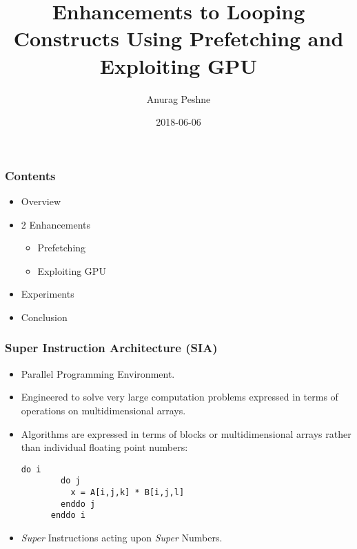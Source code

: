 \documentclass{beamer}
\title{Enhancements to Looping Constructs Using Prefetching and Exploiting GPU}
\author{Anurag Peshne}
\date{2018-06-06}
\begin{document}
\begin{frame}
  \titlepage
\end{frame}
\begin{frame}\frametitle{Contents}
  \pause
  \begin{itemize}
  \item Overview%
    \pause
  \item 2 Enhancements
    \pause
    \begin{itemize}
    \item Prefetching
      \pause
    \item Exploiting GPU
      \pause
    \end{itemize}
  \item Experiments
    \pause
  \item Conclusion
  \end{itemize}
\end{frame}

\begin{frame}[fragile]\frametitle{Super Instruction Architecture (SIA)}
  \begin{itemize}
    \pause
  \item Parallel Programming Environment.
    \pause
  \item Engineered to solve very large computation problems expressed in terms of
    operations on multidimensional arrays.
    \pause
  \item Algorithms are expressed in terms of blocks or multidimensional arrays
    rather than individual floating point numbers:
    \begin{lstlisting}[]
      do i
        do j
          x = A[i,j,k] * B[i,j,l]
        enddo j
      enddo i
    \end{lstlisting}
    \pause
  \item \textit{Super} Instructions acting upon \textit{Super} Numbers.
  \end{itemize}
\end{frame}
\end{document}
